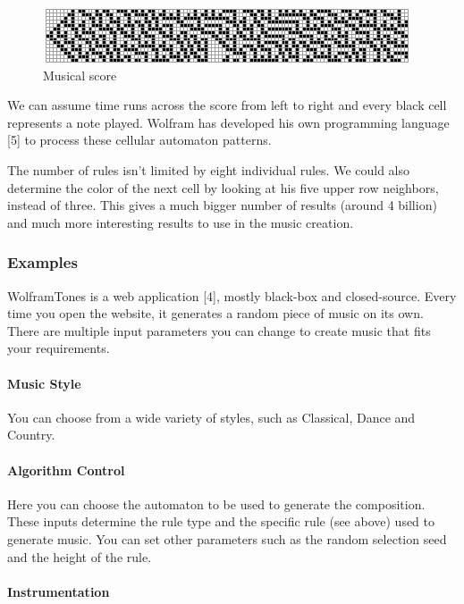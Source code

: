 \documentclass[12pt]{article}
\begin{document}
\begin{figure}[h]
\centering
\includegraphics[]{img/wolframMusic2}
\caption{Musical score}
\end{figure}

We can assume time runs across the score from left to right and every black cell represents a note played. Wolfram has developed his own programming language [5] to process these cellular automaton patterns.
\newline

The number of rules isn't limited by eight individual rules. We could also determine the color of the next cell by looking at his five upper row neighbors, instead of three. This gives a much bigger number of results (around 4 billion) and much more interesting results to use in the music creation. 

\subsubsection{Examples}

WolframTones is a web application [4], mostly black-box and closed-source. Every time you open the website, it generates a random piece of music on its own. There are multiple input parameters you can change to create music that fits your requirements. 

\paragraph{Music Style} You can choose from a wide variety of styles, such as Classical, Dance and Country.

\paragraph{Algorithm Control}

Here you can choose the automaton to be used to generate the composition. These inputs determine the rule type and the specific rule (see above) used to generate music. You can set other parameters such as the random selection seed and the height of the rule.

\paragraph{Instrumentation}
\end{document}
